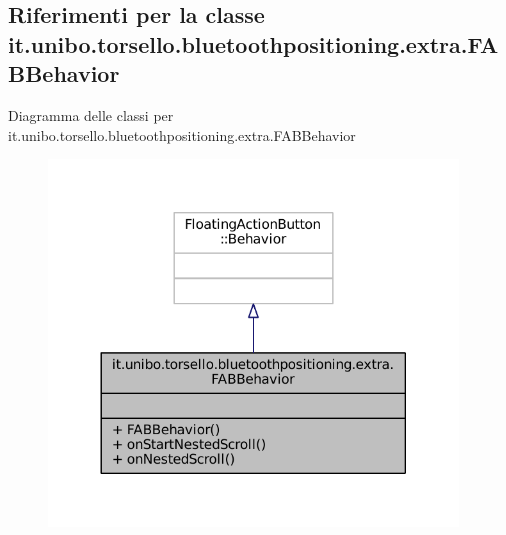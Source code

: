\hypertarget{classit_1_1unibo_1_1torsello_1_1bluetoothpositioning_1_1extra_1_1FABBehavior}{}\subsection{Riferimenti per la classe it.\+unibo.\+torsello.\+bluetoothpositioning.\+extra.\+F\+A\+B\+Behavior}
\label{classit_1_1unibo_1_1torsello_1_1bluetoothpositioning_1_1extra_1_1FABBehavior}


Diagramma delle classi per it.\+unibo.\+torsello.\+bluetoothpositioning.\+extra.\+F\+A\+B\+Behavior
\nopagebreak
\begin{figure}[H]
\begin{center}
\leavevmode
\includegraphics[width=308pt]{classit_1_1unibo_1_1torsello_1_1bluetoothpositioning_1_1extra_1_1FABBehavior__inherit__graph}
\end{center}
\end{figure}


